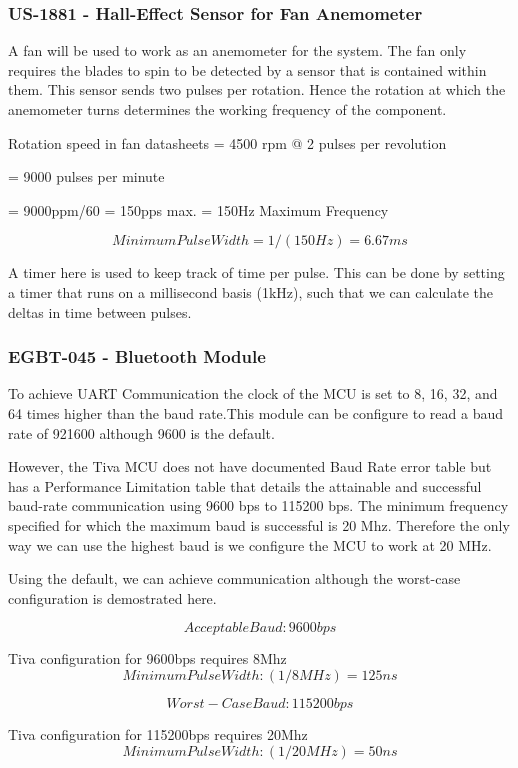 		\subsubsection{US-1881 - Hall-Effect Sensor for Fan Anemometer}
			A fan will be used to work as an anemometer for the system. The fan only requires the blades to spin to be detected by a sensor that is contained within them. This sensor sends two pulses per rotation. Hence the rotation at which the anemometer turns determines the working frequency of the component.

			
				Rotation speed in fan datasheets = 4500 rpm @ 2 pulses per revolution
			
				= 9000 pulses per minute
			
				= 9000ppm/60 = 150pps max. = 150Hz Maximum Frequency

			$$Minimum Pulse Width = 1/(150Hz) = 6.67 ms$$

			A timer here is used to keep track of time per pulse. This can be done by setting a timer that runs on a millisecond basis (1kHz), such that we can calculate the deltas in time between pulses.

		\subsubsection{EGBT-045 - Bluetooth Module}
			To achieve UART Communication the clock of the MCU is set to 8, 16, 32, and 64 times higher than the baud rate.This module can be configure to read a baud rate of 921600 although 9600 is the default. 

			However, the Tiva MCU does not have documented Baud Rate error table but has a Performance Limitation table that details the attainable and successful baud-rate communication using 9600 bps to 115200 bps. The minimum frequency specified for which the maximum baud is successful is 20 Mhz. Therefore the only way we can use the highest baud is we configure the MCU to work at 20 MHz.

			Using the default, we can achieve communication although the worst-case configuration is demostrated here.

			$$ Acceptable Baud: 9600bps $$
			
				Tiva configuration for 9600bps requires 8Mhz
			$$ Minimum Pulse Width: (1/8MHz) = 125 ns $$

			$$ Worst-Case Baud: 115200bps $$
			
				Tiva configuration for 115200bps requires 20Mhz
			$$ Minimum Pulse Width: (1/20MHz) = 50 ns $$

